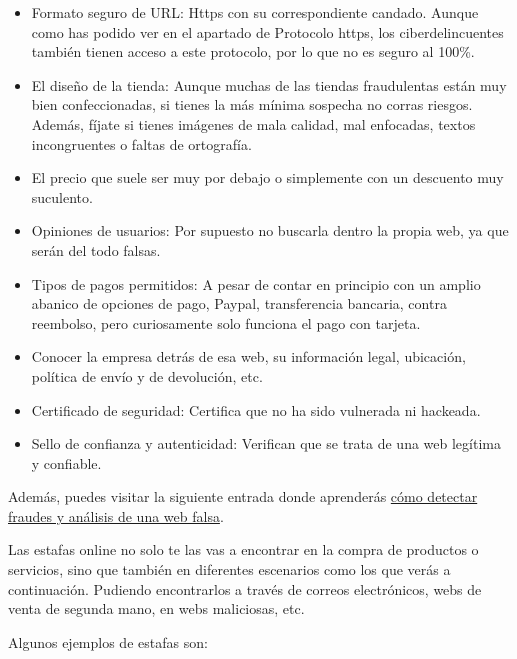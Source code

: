 \documentclass[
  spanish,
  a4paper,
  openany]{book}
\begin{document}
\begin{itemize}
\item
  Formato seguro de URL: Https con su correspondiente candado. Aunque como has podido ver en el apartado de Protocolo https, los ciberdelincuentes también tienen acceso a este protocolo, por lo que no es seguro al 100\%.
\item
  El diseño de la tienda: Aunque muchas de las tiendas fraudulentas están muy bien confeccionadas, si tienes la más mínima sospecha no corras riesgos. Además, fíjate si tienes imágenes de mala calidad, mal enfocadas, textos incongruentes o faltas de ortografía.
\item
  El precio que suele ser muy por debajo o simplemente con un descuento muy suculento.
\item
  Opiniones de usuarios: Por supuesto no buscarla dentro la propia web, ya que serán del todo falsas.
\item
  Tipos de pagos permitidos: A pesar de contar en principio con un amplio abanico de opciones de pago, Paypal, transferencia bancaria, contra reembolso, pero curiosamente solo funciona el pago con tarjeta.
\item
  Conocer la empresa detrás de esa web, su información legal, ubicación, política de envío y de devolución, etc.
\item
  Certificado de seguridad: Certifica que no ha sido vulnerada ni hackeada.
\item
  Sello de confianza y autenticidad: Verifican que se trata de una web legítima y confiable.
\end{itemize}

Además, puedes visitar la siguiente entrada donde aprenderás \href{https://www.osi.es/es/actualidad/blog/2018/08/08/detectando-fraudes-analisis-de-una-web-de-venta-falsa}{cómo detectar fraudes y análisis de una web falsa}.

Las estafas online no solo te las vas a encontrar en la compra de productos o servicios, sino que también en diferentes escenarios como los que verás a continuación. Pudiendo encontrarlos a través de correos electrónicos, webs de venta de segunda mano, en webs maliciosas, etc.

Algunos ejemplos de estafas son:
\end{document}
